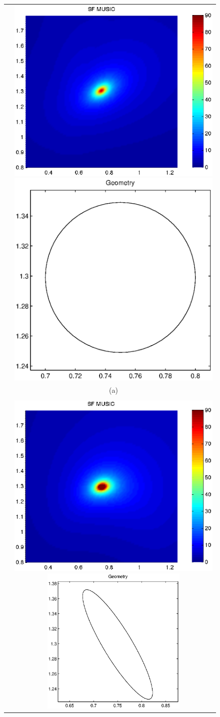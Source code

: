 \documentclass[final]{siamltex}
\numberwithin{equation}{section}
\numberwithin{figure}{section}
\numberwithin{table}{section}
\begin{document}
\begin{figure}[!h]
\centering
\begin{tabular}{lc}
 & \includegraphics[width=7.cm]{disk.eps} \hspace{0.5cm}
\includegraphics[width=7.cm]{disk_geometry.eps}\\
& (a)\\ \tabularnewline  &
\includegraphics[width=7.cm]{ellipse.eps}
\hspace{0.5cm} \includegraphics[width=7cm]{ellipse_geometry.eps} \\

\end{tabular}
\end{figure}
\end{document}
